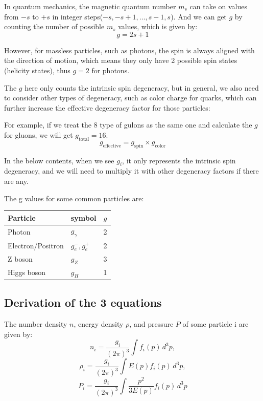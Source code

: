 \bigskip\noindent
\begin{foundation}
    In quantum mechanics, the magnetic quantum number $m_s$ can take on values from $-s$ to $+s$ in integer steps($-s, -s+1, \ldots, s-1, s$). And we can get $g$ by counting the number of possible $m_s$ values, which is given by:
    \[
        g = 2s + 1
    \]

    However, for massless particles, such as photons, the spin is always aligned with the direction of motion, which means they only have 2 possible spin states (helicity states), thus $g = 2$ for photons.
\end{foundation}

\begin{remark}
    The $g$ here only counts the intrinsic spin degeneracy, but in general, we also need to consider other types of degeneracy, such as color charge for quarks, which can further increase the effective degeneracy factor for those particles:

    For example, if we treat the 8 type of gulons as the same one and calculate the $g$ for gluons,  we will get $g_\text{total} = 16$.
    \[
        g_\text{effective} = g_\text{spin} \times g_\text{color} 
    \]

    In the below contents, when we see $g_i$, it only represents the intrinsic spin degeneracy, and we will need to multiply it with other degeneracy factors if there are any.
\end{remark}

\clearpage
\begin{extra}
    The g values for some common particles are:
    \begin{center}
    \begin{tabular}{p{4cm}p{5cm}c}
        \toprule
        Particle & symbol & $g$ \\
        \midrule
        Photon & $g_\gamma$ & 2 \\
        Electron/Positron & $g_e^-, g_e^+$ & 2 \\
        Z boson & $g_Z$ & 3 \\
        Higgs boson & $g_H$ & 1 \\
        \bottomrule
    \end{tabular}
    \end{center}
\end{extra}

\bigskip\noindent \bigskip\noindent \bigskip\noindent
\subsection{Derivation of the 3 equations}
\begin{theory}
    The number density $n$, energy density $\rho$, and pressure $P$ of some particle i are given by:
    \[
        n_i = \frac{g_i}{(2\pi)^3} \int f_i(p) \, d^3p,
    \]
    \[
        \rho_i = \frac{g_i}{(2\pi)^3} \int E(p) f_i(p) \, d^3p,
    \]
    \[
        P_i = \frac{g_i}{(2\pi)^3} \int \frac{p^2}{3E(p)} f_i(p) \, d^3p
    \]
\end{theory}

